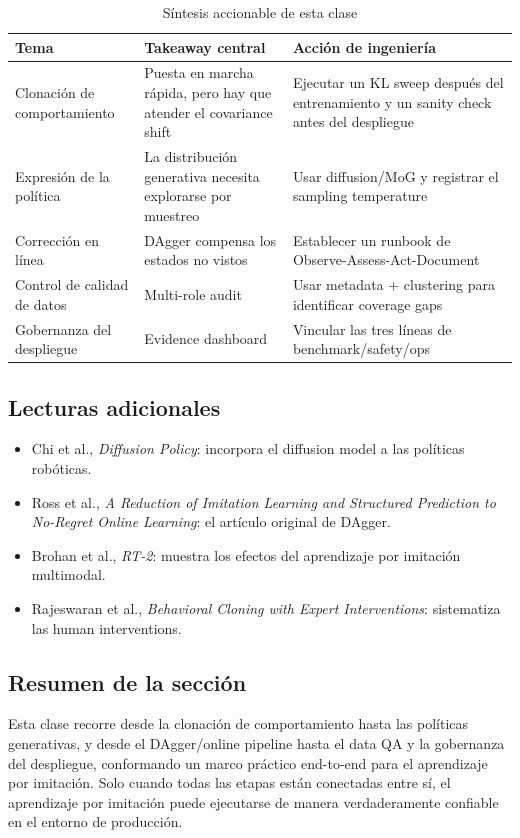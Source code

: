 \documentclass[a4paper]{article}
\begin{document}
\begin{table}[H]
\centering
\begin{tabular}{p{} p{} p{}}
\toprule
Tema & Takeaway central & Acción de ingeniería \\
\midrule
Clonación de comportamiento & Puesta en marcha rápida, pero hay que atender el covariance shift & Ejecutar un KL sweep después del entrenamiento y un sanity check antes del despliegue \\
Expresión de la política & La distribución generativa necesita explorarse por muestreo & Usar diffusion/MoG y registrar el sampling temperature \\
Corrección en línea & DAgger compensa los estados no vistos & Establecer un runbook de Observe-Assess-Act-Document \\
Control de calidad de datos & Multi-role audit & Usar metadata + clustering para identificar coverage gaps \\
Gobernanza del despliegue & Evidence dashboard & Vincular las tres líneas de benchmark/safety/ops \\
\bottomrule
\end{tabular}
\caption{Síntesis accionable de esta clase}
\end{table}

\subsection{Lecturas adicionales}
\begin{itemize}
    \item Chi et al., \textit{Diffusion Policy}: incorpora el diffusion model a las políticas robóticas.
    \item Ross et al., \textit{A Reduction of Imitation Learning and Structured Prediction to No-Regret Online Learning}: el artículo original de DAgger.
    \item Brohan et al., \textit{RT-2}: muestra los efectos del aprendizaje por imitación multimodal.
    \item Rajeswaran et al., \textit{Behavioral Cloning with Expert Interventions}: sistematiza las human interventions.
\end{itemize}

\subsection{Resumen de la sección}

Esta clase recorre desde la clonación de comportamiento hasta las políticas generativas, y desde el DAgger/online pipeline hasta el data QA y la gobernanza del despliegue, conformando un marco práctico end-to-end para el aprendizaje por imitación. Solo cuando todas las etapas están conectadas entre sí, el aprendizaje por imitación puede ejecutarse de manera verdaderamente confiable en el entorno de producción.
\end{document}
